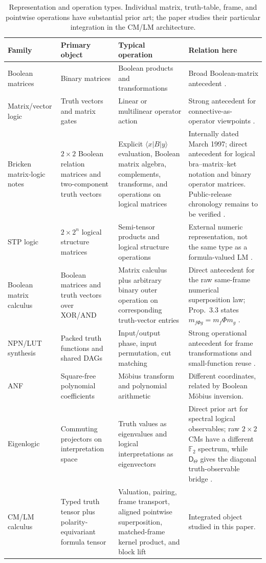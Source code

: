 \documentclass[11pt]{article}
\theoremstyle{definition}
\theoremstyle{remark}
\newcommand{\F}{\mathbb F}
\begin{document}
\begin{table}[ht]
\centering\footnotesize
\begin{tabular}{L{.15\linewidth}L{.20\linewidth}L{.22\linewidth}L{.31\linewidth}}
\toprule
Family & Primary object & Typical operation & Relation here\\
\midrule
Boolean matrices & Binary matrices & Boolean products and transformations & Broad Boolean-matrix antecedent \cite{Edwards1972}.\\
Matrix/vector logic & Truth vectors and matrix gates & Linear or multilinear operator action & Strong antecedent for connective-as-operator viewpoints \cite{Stern1988,Mizraji1992,Mizraji2008}.\\
Bricken matrix-logic notes & $2\times2$ Boolean relation matrices and two-component truth vectors & Explicit $\langle x|B|y\rangle$ evaluation, Boolean matrix algebra, complements, transforms, and operations on logical matrices & Internally dated March 1997; direct antecedent for logical bra--matrix--ket notation and binary operator matrices.  Public-release chronology remains to be verified \cite{Bricken1997}.\\
STP logic & $2\times2^n$ logical structure matrices & Semi-tensor products and logical structure operations & External numeric representation, not the same type as a formula-valued LM \cite{ChengQi2010,ZhaoSTP}.\\
Boolean matrix calculus & Boolean matrices and truth vectors over XOR/AND & Matrix calculus plus arbitrary binary outer operation on corresponding truth-vector entries & Direct antecedent for the raw same-frame numerical superposition law; Prop.~3.3 states $m_{f\Phi g}=m_f\Phi m_g$ \cite{Cheng2011}.\\
NPN/LUT synthesis & Packed truth functions and shared DAGs & Input/output phase, input permutation, cut matching & Strong operational antecedent for frame transformations and small-function reuse \cite{Mishchenko2006,Zhou2019}.\\
ANF & Square-free polynomial coefficients & M\"obius transform and polynomial arithmetic & Different coordinates, related by Boolean M\"obius inversion.\\
Eigenlogic & Commuting projectors on interpretation space & Truth values as eigenvalues and logical interpretations as eigenvectors & Direct prior art for spectral logical observables; raw $2\times2$ CMs have a different $\F_2$ spectrum, while $\mathsf D_\Theta$ gives the diagonal truth-observable bridge \cite{Toffano2015,DuboisToffano2016}.\\
CM/LM calculus & Typed truth tensor plus polarity-equivariant formula tensor & Valuation, pairing, frame transport, aligned pointwise superposition, matched-frame kernel product, and block lift & Integrated object studied in this paper.\\
\bottomrule
\end{tabular}
\caption{Representation and operation types.  Individual matrix, truth-table, frame, and pointwise operations have substantial prior art; the paper studies their particular integration in the CM/LM architecture.}
\label{tab:related}
\end{table}
\end{document}
